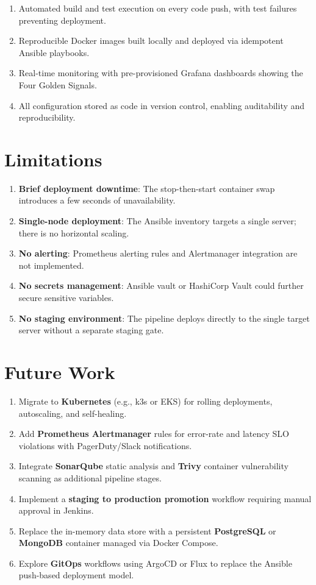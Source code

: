 \documentclass[12pt,a4paper]{report}
\begin{document}
\begin{enumerate}
    \item Automated build and test execution on every code push, with test failures preventing deployment.
    \item Reproducible Docker images built locally and deployed via idempotent Ansible playbooks.
    \item Real-time monitoring with pre-provisioned Grafana dashboards showing the Four Golden Signals.
    \item All configuration stored as code in version control, enabling auditability and reproducibility.
\end{enumerate}

\section{Limitations}
\begin{enumerate}
    \item \textbf{Brief deployment downtime}: The stop-then-start container swap introduces a few seconds of unavailability.
    \item \textbf{Single-node deployment}: The Ansible inventory targets a single server; there is no horizontal scaling.
    \item \textbf{No alerting}: Prometheus alerting rules and Alertmanager integration are not implemented.
    \item \textbf{No secrets management}: Ansible vault or HashiCorp Vault could further secure sensitive variables.
    \item \textbf{No staging environment}: The pipeline deploys directly to the single target server without a separate staging gate.
\end{enumerate}

\section{Future Work}
\begin{enumerate}
    \item Migrate to \textbf{Kubernetes} (e.g., k3s or EKS) for rolling deployments, autoscaling, and self-healing.
    \item Add \textbf{Prometheus Alertmanager} rules for error-rate and latency SLO violations with PagerDuty/Slack notifications.
    \item Integrate \textbf{SonarQube} static analysis and \textbf{Trivy} container vulnerability scanning as additional pipeline stages.
    \item Implement a \textbf{staging to production promotion} workflow requiring manual approval in Jenkins.
    \item Replace the in-memory data store with a persistent \textbf{PostgreSQL} or \textbf{MongoDB} container managed via Docker Compose.
    \item Explore \textbf{GitOps} workflows using ArgoCD or Flux to replace the Ansible push-based deployment model.
\end{enumerate}
\end{document}
